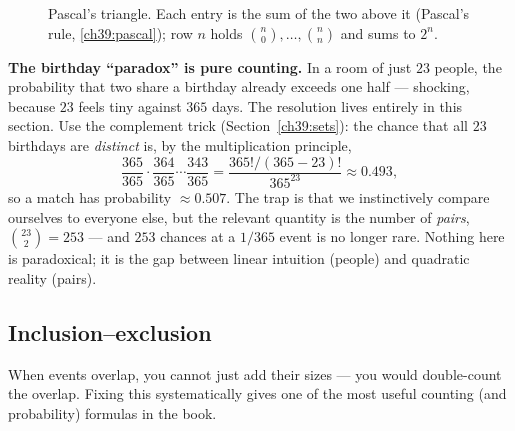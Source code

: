 \begin{figure}[H]
\centering
{}
\caption{Pascal's triangle. Each entry is the sum of the two above it
(Pascal's rule, \eqref{ch39:pascal}); row $n$ holds $\binom{n}{0},\dots,
\binom{n}{n}$ and sums to $2^n$.}
\label{ch39:pascalfig}
\end{figure}

\begin{paradoxbox}
\textbf{The birthday ``paradox'' is pure counting.} In a room of just $23$
people, the probability that two share a birthday already exceeds one half ---
shocking, because $23$ feels tiny against $365$ days. The resolution lives
entirely in this section. Use the complement trick (Section~\ref{ch39:sets}):
the chance that all $23$ birthdays are \emph{distinct} is, by the
multiplication principle,
\[
  \frac{365}{365}\cdot\frac{364}{365}\cdots\frac{343}{365}
  = \frac{365!/(365-23)!}{365^{23}} \approx 0.493,
\]
so a match has probability $\approx 0.507$. The trap is that we instinctively
compare ourselves to everyone else, but the relevant quantity is the number of
\emph{pairs}, $\binom{23}{2} = 253$ --- and $253$ chances at a $1/365$ event
is no longer rare. Nothing here is paradoxical; it is the gap between linear
intuition (people) and quadratic reality (pairs).
\end{paradoxbox}

\subsection{Inclusion--exclusion}

When events overlap, you cannot just add their sizes --- you would
double-count the overlap. Fixing this systematically gives one of the most
useful counting (and probability) formulas in the book.

